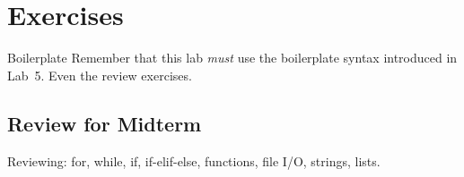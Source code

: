 \documentclass[11pt]{cselabheader}
\begin{document}


\section{Exercises}
\label{sec:ex}

\begin{warningbox}{Boilerplate}
  Remember that this lab \emph{must} use the
  boilerplate syntax introduced in Lab~5. Even the review exercises.
\end{warningbox}

\subsection{Review for Midterm}
\label{subsec:reviewex}

Reviewing: for, while, if, if-elif-else, functions, file I/O, strings, lists. 
\end{document}
